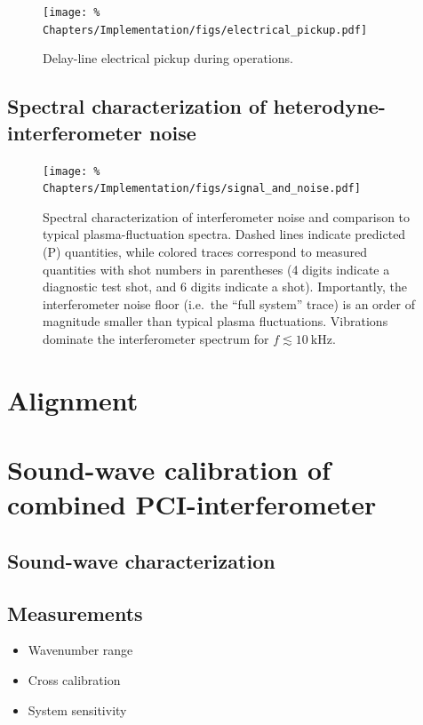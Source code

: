 \begin{figure}
  \centering
  \texttt{[image: \%
    Chapters/Implementation/figs/electrical\_pickup.pdf]}
  \caption[Delay-line electrical pickup during \diiid\space operations]{%
    Delay-line electrical pickup during \diiid\space operations.
  }
  \label{fig:Implementation:electrical_pickup}
\end{figure}


\subsection{Spectral characterization of heterodyne-interferometer noise}
\label{sec:Implementation:Noise:interferometer}
\begin{figure}
  \centering
  \texttt{[image: \%
    Chapters/Implementation/figs/signal\_and\_noise.pdf]}
  \caption[Spectral characterization of interferometer noise]{%
    Spectral characterization of interferometer noise and
    comparison to typical plasma-fluctuation spectra.
    Dashed lines indicate predicted (P) quantities, while
    colored traces correspond to measured quantities
    with shot numbers in parentheses
    (4 digits indicate a diagnostic test shot, and
    6 digits indicate a \diiid\space shot).
    Importantly, the interferometer noise floor
    (i.e.\ the ``full system'' trace)
    is an order of magnitude smaller than
    typical plasma fluctuations.
    Vibrations dominate the interferometer spectrum
    for $f \lesssim \SI{10}{\kilo\hertz}$.
  }
\label{fig:Implementation:signal_and_noise}
\end{figure}


\section{Alignment}
\label{sec:Implementation:Alignment}
\section{Sound-wave calibration of combined PCI-interferometer}
\subsection{Sound-wave characterization}
\subsection{Measurements}
\begin{itemize}
  \item Wavenumber range
  \item Cross calibration
  \item System sensitivity
\end{itemize}

